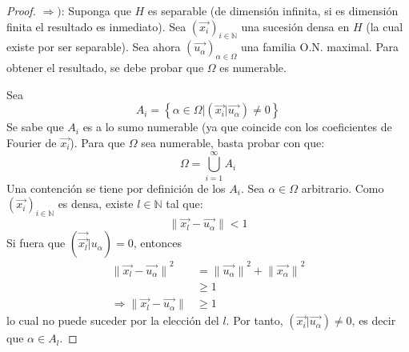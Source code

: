 \documentclass[12pt]{report}
\newcounter{it}
\theoremstyle{largebreak}
\newcommand\norm[1]{\ensuremath{\|#1\|}}
\newcommand\pint[2]{\ensuremath{\left(#1\big| #2\right)}}
\begin{document}
    \begin{proof}
        $\Rightarrow)$: Suponga que $H$ es separable (de dimensión infinita, si es dimensión finita el resultado es inmediato). Sea $\left(\vec{x_i} \right)_{i\in\mathbb{N}}$ una sucesión densa en $H$ (la cual existe por ser separable). Sea ahora $\left(\vec{u_\alpha} \right)_{\alpha\in\Omega}$ una familia O.N. maximal. Para obtener el resultado, se debe probar que $\Omega$ es numerable.

        Sea
        \begin{equation*}
            A_i=\left\{\alpha\in\Omega\Big|\pint{\vec{x_i}}{\vec{u_\alpha}}\neq0 \right\}
        \end{equation*}
        Se sabe que $A_i$ es a lo sumo numerable (ya que coincide con los coeficientes de Fourier de $\vec{x_i}$). Para que $\Omega$ sea numerable, basta probar con que:
        \begin{equation*}
            \Omega=\bigcup_{ i=1}^\infty A_i
        \end{equation*}
        Una contención se tiene por definición de los $A_i$. Sea $\alpha\in\Omega$ arbitrario. Como $\left(\vec{x_i} \right)_{i\in\mathbb{N}}$ es densa, existe $l\in\mathbb{N}$ tal que:
        \begin{equation*}
            \norm{\vec{x_l}-\vec{u_\alpha}}<1
        \end{equation*}
        Si fuera que $\pint{\vec{\vec{x_l}}}{u_\alpha}=0$, entonces
        \begin{equation*}
            \begin{split}
                \norm{\vec{x_l}-\vec{u_\alpha}}^2&=\norm{\vec{u_\alpha}}^2+\norm{\vec{x_\alpha}}^2\\
                &\geq 1\\
                \Rightarrow \norm{\vec{x_l}-\vec{u_\alpha}}&\geq1
            \end{split}
        \end{equation*}
        lo cual no puede suceder por la elección del $l$. Por tanto, $\pint{\vec{x_i}}{\vec{u_\alpha}}\neq0$, es decir que $\alpha\in A_l$.


\end{proof}
\end{document}
